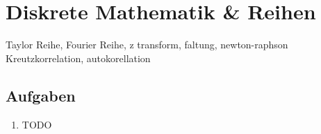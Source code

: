 \chapter{Diskrete Mathematik \& Reihen}

Taylor Reihe, Fourier Reihe, z transform, faltung, newton-raphson
Kreutzkorrelation, autokorellation

\section{Aufgaben}
\begin{enumerate}
\item TODO
\end{enumerate}
